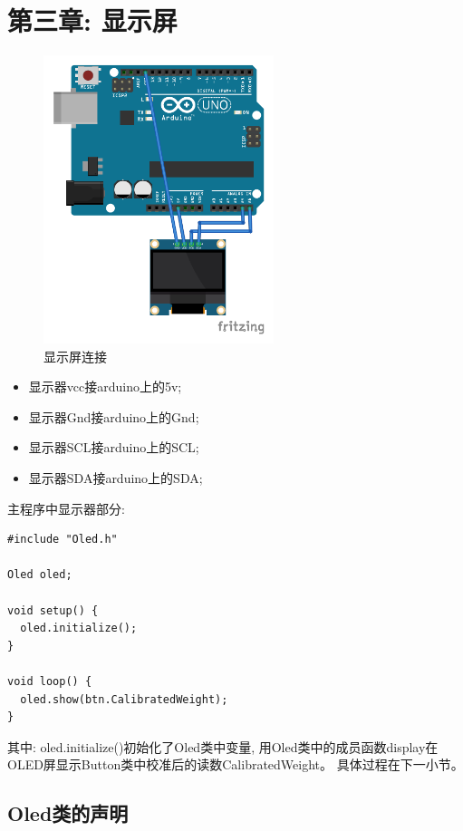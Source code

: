 \documentclass{article}
\begin{document}
\section{第三章: 显示屏}
\begin{figure}[h]
	\centering
	\includegraphics[width=0.6\textwidth]{../3_Chapter3_DISPLAY/Picture/OLED.pdf}
	\caption{显示屏连接}
	\label{fig:显示屏连接}
	\hfill
\end{figure}

\begin{itemize}
	\item 显示器vcc接arduino上的5v;
	\item 显示器Gnd接arduino上的Gnd;
	\item 显示器SCL接arduino上的SCL;
	\item 显示器SDA接arduino上的SDA;
\end{itemize}

主程序中显示器部分:
\begin{lstlisting}
#include "Oled.h"

Oled oled;

void setup() {
  oled.initialize();
}

void loop() {
  oled.show(btn.CalibratedWeight);
}
\end{lstlisting}

其中: oled.initialize()初始化了Oled类中变量, 用Oled类中的成员函数display在OLED屏显示Button类中校准后的读数CalibratedWeight。
具体过程在下一小节。

\subsection{Oled类的声明}
\end{document}
